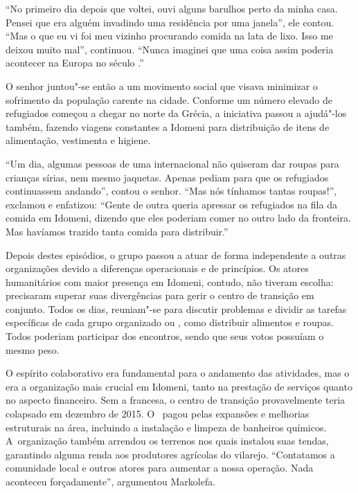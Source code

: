 ``No primeiro dia depois que voltei, ouvi alguns barulhos perto da minha
casa. Pensei que era alguém invadindo uma residência por uma janela'',
ele contou. ``Mas o que eu vi foi meu vizinho procurando comida na lata
de lixo. Isso me deixou muito mal'', continuou. ``Nunca imaginei que uma
coisa assim poderia acontecer na Europa no século .''

O senhor juntou"-se então a um movimento social que visava minimizar o
sofrimento da população carente na cidade. Conforme um número elevado de 
refugiados começou a chegar no norte da Grécia, a iniciativa passou a
ajudá"-los também, fazendo viagens constantes a Idomeni para distribuição
de itens de alimentação, vestimenta e higiene. 

``Um dia, algumas pessoas de uma  internacional não quiseram dar
roupas para crianças sírias, nem mesmo jaquetas. Apenas pediam para que
os refugiados continuassem andando'', contou o senhor. ``Mas nós
tínhamos tantas roupas!'', exclamou e enfatizou: ``Gente de outra  queria
apressar os refugiados na fila da comida em Idomeni, dizendo que eles
poderiam comer no outro lado da fronteira. Mas havíamos trazido tanta
comida para distribuir.'' 

Depois destes episódios, o grupo passou a atuar de forma independente a
outras organizações devido a diferenças operacionais e de princípios. Os
atores humanitários com maior presença em Idomeni, contudo, não tiveram
escolha: precisaram superar suas divergências para gerir o centro de
transição em conjunto. Todos os dias, reuniam"-se para discutir problemas
e dividir as tarefas específicas de cada grupo organizado ou , como
distribuir alimentos e roupas. Todos poderiam participar dos encontros,
sendo que seus votos possuíam o mesmo peso.

O espírito colaborativo era fundamental para o andamento das atividades,
mas o  era a organização mais crucial em Idomeni, tanto na prestação
de serviços quanto no aspecto financeiro. Sem a  francesa, o centro
de transição provavelmente teria colapsado em dezembro de 2015. O~
pagou pelas expansões e melhorias estruturais na área,
incluindo a instalação e limpeza de banheiros químicos. A~organização
também arrendou os terrenos nos quais instalou suas tendas, garantindo
alguma renda aos produtores agrícolas do vilarejo. ``Contatamos a
comunidade local e outros atores para aumentar a nossa operação. Nada
aconteceu forçadamente'', argumentou Markolefa.

